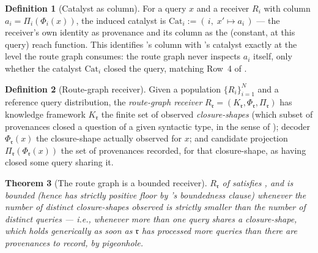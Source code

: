 \documentclass[11pt,twocolumn,a4paper]{article}
\theoremstyle{rdm}
\newtheorem{theorem}{Theorem}[section]
\theoremstyle{definition}
\newtheorem{definition}[theorem]{Definition}
\theoremstyle{remark}
\newcommand{\Know}{K}
\newcommand{\Rec}{R}
\newcommand{\rg}{\mathfrak{r}}
\newcommand{\Cat}{\mathrm{Cat}}
\begin{document}
\begin{definition}[Catalyst as column]
\label{def:catalyst-as-column}
For a query $x$ and a receiver $\Rec_i$ with column $a_i=\Pi_i(\Phi_i(x))$,
the induced catalyst is $\Cat_i:=(\,i,\;x'\mapsto a_i\,)$ — the receiver's
own identity as provenance and its column as the (constant, at this query)
reach function. This identifies \citet{sachikonye-accountable-compilation}'s
column with \citet{sachikonye-federated-context-closure}'s catalyst exactly
at the level the route graph consumes: the route graph never inspects $a_i$
itself, only whether the catalyst $\Cat_i$ closed the query, matching Row~4
of .
\end{definition}

\begin{definition}[Route-graph receiver]
\label{def:route-receiver}
Given a population $\{\Rec_i\}_{i=1}^N$ and a reference query distribution,
the \emph{route-graph receiver} $\Rec_\rg=(\Know_\rg,\Phi_\rg,\Pi_\rg)$ has
knowledge framework $\Know_\rg$ the finite set of observed
\emph{closure-shapes} (which subset of provenances closed a question of a
given syntactic type, in the sense of
\citet[Def.~4.2]{sachikonye-federated-context-closure}); decoder
$\Phi_\rg(x)$ the closure-shape actually observed for $x$; and candidate
projection $\Pi_\rg(\Phi_\rg(x))$ the set of provenances recorded, for that
closure-shape, as having closed some query sharing it.
\end{definition}

\begin{theorem}[The route graph is a bounded receiver]
\label{thm:route-receiver}
$\Rec_\rg$ of  satisfies ,
and is bounded (hence has strictly positive floor by
's boundedness clause) whenever the number of
distinct closure-shapes observed is strictly smaller than the number of
distinct queries — i.e., whenever more than one query shares a
closure-shape, which holds generically as soon as $\rg$ has processed more
queries than there are provenances to record, by pigeonhole.
\end{theorem}
\end{document}

